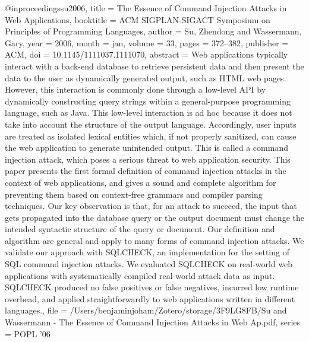 @inproceedings{su2006,
  title = {The {{Essence}} of {{Command Injection Attacks}} in {{Web Applications}}},
  booktitle = {{{ACM SIGPLAN}}-{{SIGACT}} Symposium on {{Principles}} of Programming Languages},
  author = {Su, Zhendong and Wassermann, Gary},
  year = {2006},
  month = jan,
  volume = {33},
  pages = {372--382},
  publisher = {{ACM}},
  doi = {10.1145/1111037.1111070},
  abstract = {Web applications typically interact with a back-end database to retrieve persistent data and then present the data to the user as dynamically generated output, such as HTML web pages. However, this interaction is commonly done through a low-level API by dynamically constructing query strings within a general-purpose programming language, such as Java. This low-level interaction is ad hoc because it does not take into account the structure of the output language. Accordingly, user inputs are treated as isolated lexical entities which, if not properly sanitized, can cause the web application to generate unintended output. This is called a command injection attack, which poses a serious threat to web application security. This paper presents the first formal definition of command injection attacks in the context of web applications, and gives a sound and complete algorithm for preventing them based on context-free grammars and compiler parsing techniques. Our key observation is that, for an attack to succeed, the input that gets propagated into the database query or the output document must change the intended syntactic structure of the query or document. Our definition and algorithm are general and apply to many forms of command injection attacks. We validate our approach with SQLCHECK, an implementation for the setting of SQL command injection attacks. We evaluated SQLCHECK on real-world web applications with systematically compiled real-world attack data as input. SQLCHECK produced no false positives or false negatives, incurred low runtime overhead, and applied straightforwardly to web applications written in different languages.},
  file = {/Users/benjaminjoham/Zotero/storage/3F9LG8FB/Su and Wassermann - The Essence of Command Injection Attacks in Web Ap.pdf},
  series = {{{POPL}} '06}
}

